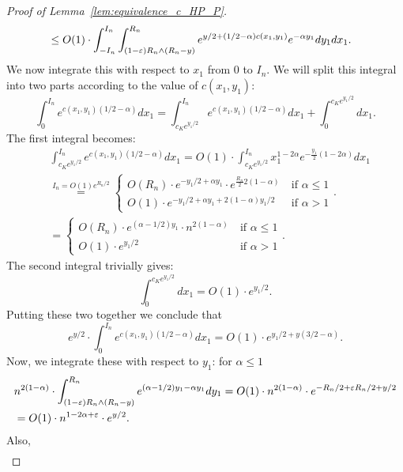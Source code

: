 \begin{proof}[Proof of Lemma~\ref{lem:equivalence_c_HP_P}]
\begin{equation*}
\begin{split}
&\leq O(1) \cdot  
\int_{-I_n}^{I_n} \int_{(1-\varepsilon) R_n \wedge (R_n-y)}^{R_n} 
e^{y/2 + (1/2 -\alpha) c(x_1,y_1)} e^{-\alpha y_1} dy_1 dx_1. 
\end{split}
\end{equation*}
We now integrate this with respect to $x_1$ from 0 to $I_n$.
We will split this integral into two parts according to the value of $c(x_1,y_1)$:
$$
\int_0^{I_n} e^{c(x_1,y_1) (1/2 -\alpha)} dx_1 = 
\int_{c_K e^{y_1/2}}^{I_n} e^{c(x_1,y_1) (1/2 -\alpha)} dx_1 + \int_0^{c_K e^{y_1/2}} dx_1.
$$
The first integral becomes: 
\begin{equation*}
\begin{split} 
&\int_{c_K e^{y_1/2}}^{I_n} e^{c(x_1,y_1) (1/2 -\alpha)} dx_1  = 
 O(1)\cdot \int_{c_K e^{y_1/2}}^{I_n} x_1^{1 -2\alpha} 
e^{-\frac{y_1}{2} (1-2\alpha)} dx_1 \\
&\stackrel{I_n = O(1)e^{R_n/2}}{=} 
\begin{cases}
O(R_n) \cdot e^{-y_1/2 + \alpha y_1} \cdot e^{\frac{R_n}{2} 2(1-\alpha)} & \ \mbox{if $\alpha \leq 1$}
\\
O(1) \cdot e^{-y_1/2 + \alpha y_1 + 2(1-\alpha)y_1/2} & \ \mbox{if $\alpha > 1$}
\end{cases}.
\\
&=\begin{cases}
O(R_n) \cdot e^{(\alpha -1/2) y_1} \cdot n^{2(1-\alpha)} & \ \mbox{if $\alpha \leq 1$}
\\
O(1) \cdot e^{y_1/2} &\ \mbox{if $\alpha > 1$}
\end{cases}.  
\end{split}
\end{equation*}
The second integral trivially gives: 
$$ \int_0^{c_K e^{y_1/2}} dx_1 = O(1) \cdot e^{y_1/2}.$$
Putting these two together we conclude that 
$$ e^{y/2} \cdot \int_0^{I_n} e^{c(x_1,y_1) (1/2 -\alpha)} dx_1 = 
O(1) \cdot e^{y_1/2 +y(3/2-\alpha)}. $$
Now, we integrate these with respect to $y_1$: for $\alpha \leq 1$
\begin{equation}
\begin{split} 
&n^{2(1-\alpha)} \cdot \int_{(1-\varepsilon) R_n \wedge (R_n-y)}^{R_n} e^{(\alpha -1/2)y_1 - \alpha y_1} dy_1 
=O(1) \cdot n^{2(1-\alpha)} \cdot e^{-R_n/2 + \varepsilon R_n/2  + y/2}  \\
&= O(1) \cdot n^{1-2\alpha + \varepsilon} \cdot e^{y/2}.
\end{split}
\end{equation}
Also,
\begin{equation}
\begin{split}

\end{split}
\end{equation}
\end{proof}
